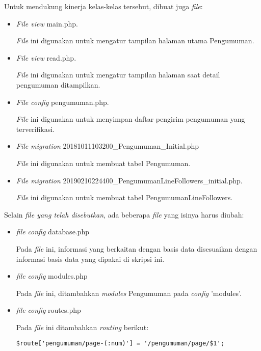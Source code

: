 Untuk mendukung kinerja kelas-kelas tersebut, dibuat juga \textit{file}:
\begin{itemize}
\item \textit{File view} main.php.

\textit{File} ini digunakan untuk mengatur tampilan halaman utama Pengumuman.

\item \textit{File view} read.php.

\textit{File} ini digunakan untuk mengatur tampilan halaman saat detail pengumuman ditampilkan.

\item \textit{File config} pengumuman.php.

\textit{File} ini digunakan untuk menyimpan daftar pengirim pengumuman yang terverifikasi.

\item \textit{File migration} 20181011103200\_Pengumuman\_Initial.php 

\textit{File} ini digunakan untuk membuat tabel Pengumuman.

\item \textit{File migration} 20190210224400\_PengumumanLineFollowers\_initial.php.

\textit{File} ini digunakan untuk membuat tabel PengumumanLineFollowers.
\end{itemize}

Selain \textit{file yang telah disebutkan}, ada beberapa \textit{file} yang isinya harus diubah:
\begin{itemize}
\item \textit{file} \textit{config} database.php

Pada \textit{file} ini, informasi yang berkaitan dengan basis data disesuaikan dengan informasi basis data yang dipakai di skripsi ini.

\item \textit{file} \textit{config} modules.php

Pada \textit{file} ini, ditambahkan \textit{modules} Pengumuman pada \textit{config} 'modules'.

\item \textit{file} \textit{config} routes.php

Pada \textit{file} ini ditambahkan \textit{routing} berikut:
\begin{lstlisting}
$route['pengumuman/page-(:num)'] = '/pengumuman/page/$1';
\end{lstlisting}
\end{itemize}

